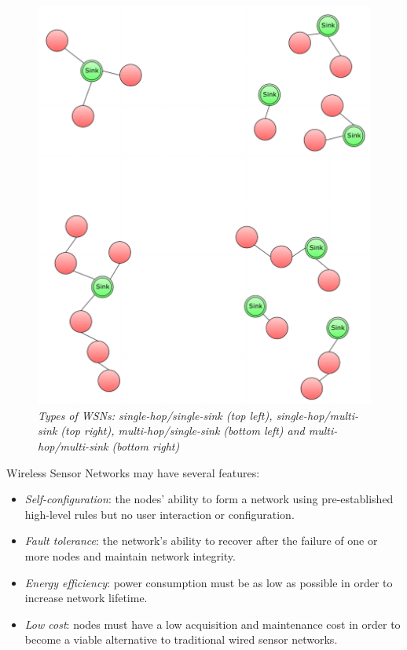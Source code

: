 \begin{figure}[ht]
	\begin{center}
		\includegraphics[scale=0.8]{img/types_of_wsn.pdf}
	\end{center}
	\caption{\small \itshape{Types of WSNs: single-hop/single-sink
	(top left), single-hop/multi-sink (top right), multi-hop/single-sink
	(bottom left) and multi-hop/multi-sink (bottom right)}}
\end{figure}

Wireless Sensor Networks may have several features:
\begin{itemize}
	\item \emph{Self-configuration}: the nodes' ability to form a network
		using pre-established high-level rules but no user interaction
		or configuration\cite{prehofer2005self}.
	\item \emph{Fault tolerance}: the network's ability to recover after
		the failure of one or more nodes and maintain network
		integrity\cite{koushanfar2002fault}.
	\item \emph{Energy efficiency}: power consumption must be as low as
		possible in order to increase network lifetime.
	\item \emph{Low cost}: nodes must have a low acquisition and
		maintenance cost in order to become a viable alternative to
		traditional wired sensor networks.
\end{itemize}

